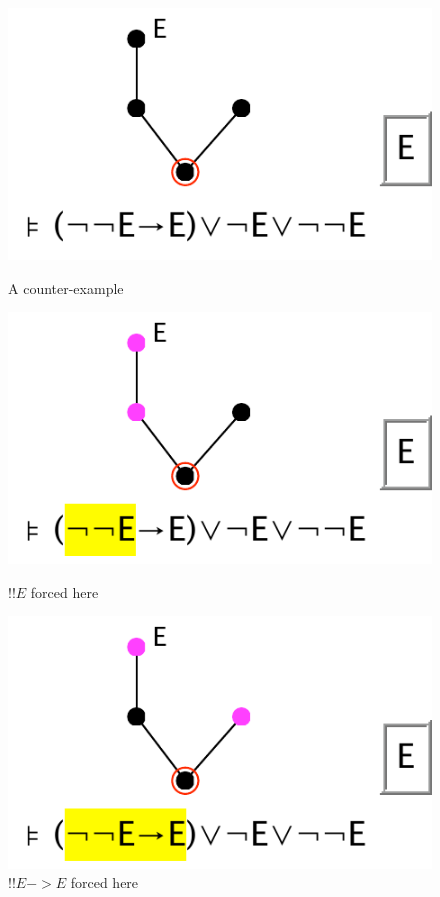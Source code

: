 \documentclass[11pt]{book}
\begin{document}
\begin{figure}
\centering
\parbox{150pt}{\centering
\includegraphics[scale=0.5]{pics/samuels0}
\caption{A counter-example}
\label{fig:samuels0}
}
\qquad
\parbox{150pt}{\centering
\includegraphics[scale=0.5]{pics/samuels1}
\caption{$!!E$ forced here}
\label{fig:samuels1}
}
\parbox{150pt}{\centering
\includegraphics[scale=0.5]{pics/samuels2}
\caption{$!!E->E$ forced here}
\label{fig:samuels2}
}
\qquad
\parbox{150pt}{\centering
}
\end{figure}
\end{document}

